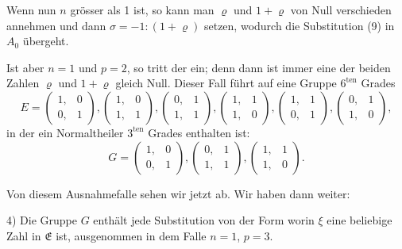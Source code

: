 
Wenn nun $n$ gr\"osser als 1 ist, so kann man $\varrho$ und $1+\varrho$ von Null verschieden annehmen und dann $\sigma=-1:(1+\varrho)$ setzen, wodurch die Substitution (9) in $A_0$ \"ubergeht.

Ist aber $n=1$ und $p=2$, so tritt der  ein; denn dann ist immer eine der beiden Zahlen $\varrho$ und $1+\varrho$ gleich Null. Dieser Fall f\"uhrt auf eine Gruppe $6^{\text{ten}}$ Grades
\[
E = \begin{pmatrix}1,&0\\0,&1\end{pmatrix}, \begin{pmatrix}1,&0\\1,&1\end{pmatrix}, \begin{pmatrix}0,&1\\1,&1\end{pmatrix}, \begin{pmatrix}1,&1\\1,&0\end{pmatrix}, \begin{pmatrix}1,&1\\0,&1\end{pmatrix}, \begin{pmatrix}0,&1\\1,&0\end{pmatrix},
\]
in der ein Normaltheiler $3^{\text{ten}}$ Grades enthalten ist:
\[
G = \begin{pmatrix}1,&0\\0,&1\end{pmatrix}, \begin{pmatrix}0,&1\\1,&1\end{pmatrix}, \begin{pmatrix}1,&1\\1,&0\end{pmatrix}.
\]

Von diesem Ausnahmefalle sehen wir jetzt ab. Wir haben dann weiter:

4) Die Gruppe $G$ enth\"alt jede Substitution von der Form
worin $\xi$ eine beliebige Zahl in $\mathfrak{E}$ ist, ausgenommen in dem Falle $n=1$, $p=3$.

